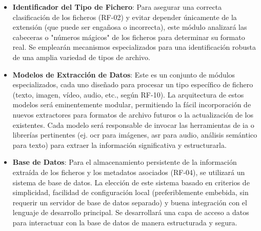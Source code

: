 \begin{itemize}
    \item \textbf{Identificador del Tipo de Fichero}:
    Para asegurar una correcta clasificación de los ficheros (RF-02) y evitar depender únicamente de la extensión (que puede ser engañosa o incorrecta), este módulo analizará las cabeceras o "números mágicos" de los ficheros para determinar su formato real. Se emplearán mecanismos especializados para una identificación robusta de una amplia variedad de tipos de archivo.

    \item \textbf{Modelos de Extracción de Datos}:
    Este es un conjunto de módulos especializados, cada uno diseñado para procesar un tipo específico de fichero (texto, imagen, vídeo, audio, etc., según RF-10). La arquitectura de estos modelos será eminentemente modular, permitiendo la fácil incorporación de nuevos extractores para formatos de archivo futuros o la actualización de los existentes. Cada modelo será responsable de invocar las herramientas de \gls{ia} o librerías pertinentes (ej. \gls{ocr} para imágenes, \gls{asr} para audio, análisis semántico para texto) para extraer la información significativa y estructurarla.

    \item \textbf{Base de Datos}:
    Para el almacenamiento persistente de la información extraída de los ficheros y los metadatos asociados (RF-04), se utilizará un sistema de base de datos. La elección de este sistema  basado en criterios de simplicidad, facilidad de configuración local (preferiblemente embebida, sin requerir un servidor de base de datos separado) y buena integración con el lenguaje de desarrollo principal. Se desarrollará una capa de acceso a datos para interactuar con la base de datos de manera estructurada y segura.


\end{itemize}
